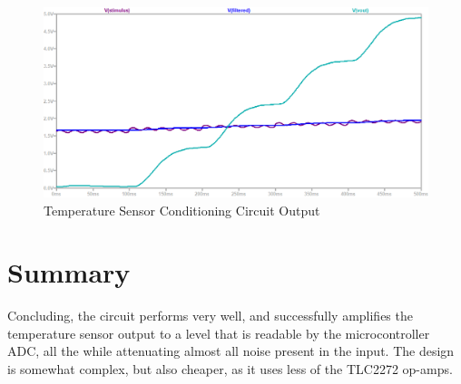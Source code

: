 \begin{figure}[h]
    \centering
    \includegraphics[width = 1\textwidth]{Figures/vout.png}
    \caption{Temperature Sensor Conditioning Circuit Output}
    \label{fig:vout}
\end{figure}

\section{Summary}\label{sec:temp_summary}
Concluding, the circuit performs very well, and successfully amplifies the temperature sensor output to a level that is readable by the microcontroller ADC, all the while attenuating almost all noise present in the input. The design is somewhat complex, but also cheaper, as it uses less of the TLC2272 op-amps.



